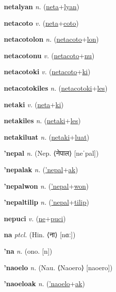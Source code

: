 \textbf{\hypertarget{netalyan}{netalyan}} \textit{n.} (\hyperlink{neta}{neta}+\allowbreak \hyperlink{lyan}{lyan})


\textbf{\hypertarget{netacoto}{netacoto}} \textit{v.} (\hyperlink{neta}{neta}+\allowbreak \hyperlink{coto}{coto})


\textbf{\hypertarget{netacotolon}{netacotolon}} \textit{n.} (\hyperlink{netacoto}{netacoto}+\allowbreak \hyperlink{lon}{lon})


\textbf{\hypertarget{netacotonu}{netacotonu}} \textit{v.} (\hyperlink{netacoto}{netacoto}+\allowbreak \hyperlink{nu}{nu})


\textbf{\hypertarget{netacotoki}{netacotoki}} \textit{v.} (\hyperlink{netacoto}{netacoto}+\allowbreak \hyperlink{ki}{ki})


\textbf{\hypertarget{netacotokiles}{netacotokiles}} \textit{n.} (\hyperlink{netacotoki}{netacotoki}+\allowbreak \hyperlink{les}{les})


\textbf{\hypertarget{netaki}{netaki}} \textit{v.} (\hyperlink{neta}{neta}+\allowbreak \hyperlink{ki}{ki})


\textbf{\hypertarget{netakiles}{netakiles}} \textit{n.} (\hyperlink{netaki}{netaki}+\allowbreak \hyperlink{les}{les})


\textbf{\hypertarget{netakiluat}{netakiluat}} \textit{n.} (\hyperlink{netaki}{netaki}+\allowbreak \hyperlink{luat}{luat})


\textbf{\hypertarget{'nepal}{'nepal}} \textit{n.} (Nep. ⟨{\devanagari{}नेपाल}⟩ [neˈpal])


\textbf{\hypertarget{'nepalak}{'nepalak}} \textit{n.} (\hyperlink{'nepal}{'nepal}+\allowbreak \hyperlink{ak}{ak})


\textbf{\hypertarget{'nepalwon}{'nepalwon}} \textit{n.} (\hyperlink{'nepal}{'nepal}+\allowbreak \hyperlink{won}{won})


\textbf{\hypertarget{'nepaltilip}{'nepaltilip}} \textit{n.} (\hyperlink{'nepal}{'nepal}+\allowbreak \hyperlink{tilip}{tilip})


\textbf{\hypertarget{nepuci}{nepuci}} \textit{v.} (\hyperlink{ne}{ne}+\allowbreak \hyperlink{puci}{puci})


\textbf{\hypertarget{na}{na}} \textit{ptcl.} (Hin. ⟨{\devanagari{}ना}⟩ [nɑː])


\textbf{\hypertarget{'na}{'na}} \textit{n.} (ono. [n])


\textbf{\hypertarget{'naoelo}{'naoelo}} \textit{n.} (Nau. ⟨Naoero⟩ [naoero])


\textbf{\hypertarget{'naoeloak}{'naoeloak}} \textit{n.} (\hyperlink{'naoelo}{'naoelo}+\allowbreak \hyperlink{ak}{ak})


